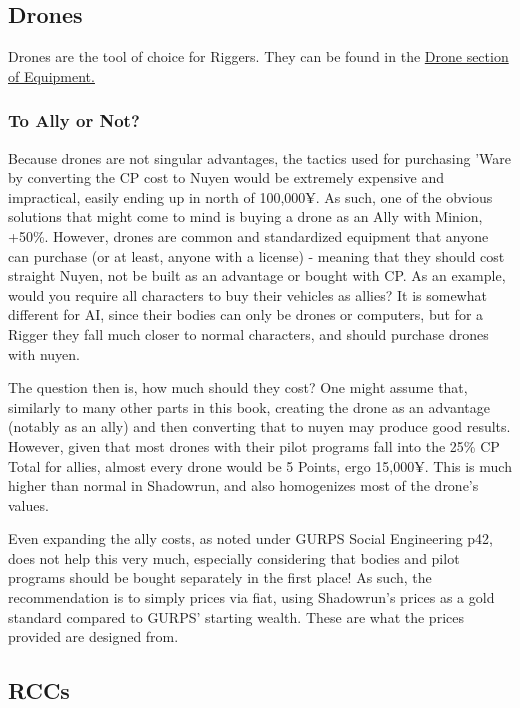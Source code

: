 \begin{multicols*}{3}
	\subsection{Drones}
	
	Drones are the tool of choice for Riggers. They can be found in the \hyperref[drones]{Drone section of Equipment.}
	
	\subsubsection{To Ally or Not?}
	
	Because drones are not singular advantages, the tactics used for purchasing 'Ware by converting the CP cost to Nuyen would be extremely expensive and impractical, easily ending up in north of 100,000¥. As such, one of the obvious solutions that might come to mind is buying a drone as an Ally with Minion, +50\%. However, drones are common and standardized equipment that anyone can purchase (or at least, anyone with a license) - meaning that they should cost straight Nuyen, not be built as an advantage or bought with CP. As an example, would you require all characters to buy their vehicles as allies? It is somewhat different for AI, since their bodies can only be drones or computers, but for a Rigger they fall much closer to normal characters, and should purchase drones with nuyen.
	
	The question then is, how much should they cost? One might assume that, similarly to many other parts in this book, creating the drone as an advantage (notably as an ally) and then converting that to nuyen may produce good results. However, given that most drones with their pilot programs fall into the 25\% CP Total for allies, almost every drone would be 5 Points, ergo 15,000¥. This is much higher than normal in Shadowrun, and also homogenizes most of the drone's values.
	
	Even expanding the ally costs, as noted under GURPS Social Engineering p42, does not help this very much, especially considering that bodies and pilot programs should be bought separately in the first place! As such, the recommendation is to simply prices via fiat, using Shadowrun's prices as a gold standard compared to GURPS' starting wealth. These are what the prices provided are designed from.
	
	\subsection{RCCs}
	

\end{multicols*}
